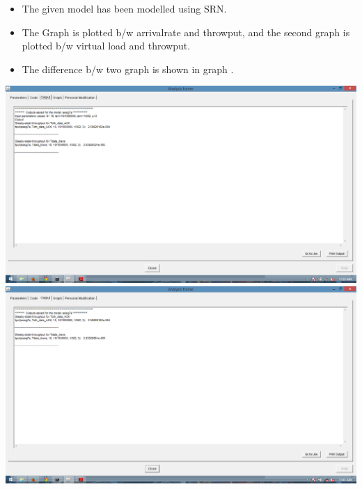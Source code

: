 \documentclass[a4paper,12pt]{article}
\begin{document}
\begin{itemize}
  \item The given model has been modelled using SRN.
  \item The Graph is plotted b/w arrivalrate and throwput, and the second graph is plotted b/w virtual load and throwput.
  \item The difference b/w two graph is shown in graph .
\end{itemize}
 \includegraphics[width=15 cm,height=13 cm]{output1.png}
 \includegraphics[width=15 cm,height=13 cm]{output2.png}
\end{document}

